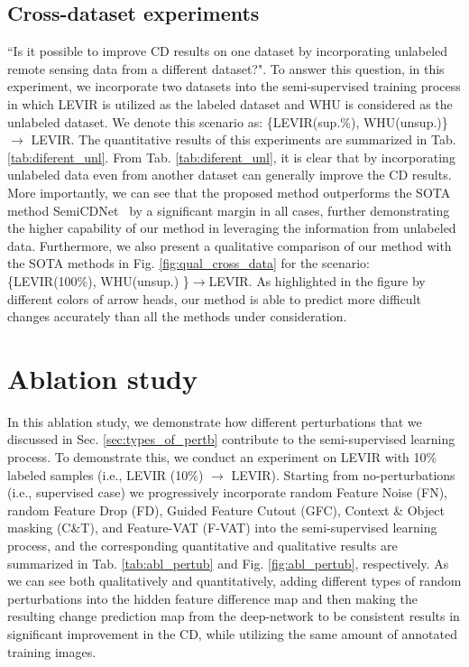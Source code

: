 \documentclass[runningheads]{llncs}
\begin{document}
\subsection{Cross-dataset experiments}
\vspace{-3mm}
``Is it possible to improve CD results on one dataset by incorporating unlabeled remote sensing data from a different dataset?". To answer this question, in this experiment, we incorporate two datasets into the semi-supervised training process in which LEVIR is utilized as the labeled dataset and WHU is considered as the unlabeled dataset. We denote this scenario as: \{LEVIR(sup.\%), WHU(unsup.)\} $\rightarrow$ LEVIR. The quantitative results of this experiments are summarized in Tab. \ref{tab:diferent_unl}. From Tab. \ref{tab:diferent_unl}, it is clear that by incorporating unlabeled data even from another dataset can generally improve the CD results. More importantly, we can see that the proposed method outperforms the SOTA method SemiCDNet~\cite{SemiCDNet} by a significant margin in all cases, further demonstrating the higher capability of our method in leveraging the information from unlabeled data. Furthermore, we also present a qualitative comparison of our method with the SOTA methods in Fig. \ref{fig:qual_cross_data} for the scenario: \{LEVIR(100\%), WHU(unsup.) \}$\rightarrow$LEVIR. As highlighted in the figure by different colors of arrow heads, our method is able to predict more difficult changes accurately than all the methods under consideration.    

\section{Ablation study}
\vspace{-1mm}
In this ablation study, we demonstrate how different perturbations that we discussed in Sec. \ref{sec:types_of_pertb} contribute to the semi-supervised learning process. To demonstrate this, we conduct an experiment on LEVIR with 10\% labeled samples (i.e., LEVIR (10\%) $\rightarrow$ LEVIR). Starting from no-perturbations (i.e., supervised case) we progressively incorporate random Feature Noise (FN), random Feature Drop (FD), Guided Feature Cutout (GFC), Context \& Object masking (C\&T), and Feature-VAT (F-VAT) into the semi-supervised learning process, and the corresponding quantitative and qualitative results are summarized in Tab. \ref{tab:abl_pertub} and Fig. \ref{fig:abl_pertub}, respectively. As we can see both qualitatively and quantitatively, adding different types of random perturbations into the hidden feature difference map and then making the resulting change prediction map from the deep-network to be consistent results in significant improvement in the CD, while utilizing the same amount of annotated training images. 
\end{document}
